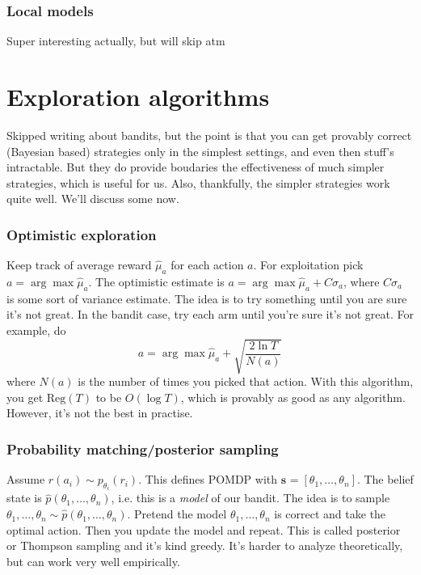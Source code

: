\documentclass{report}
\newcommand{\argmax}{\arg\!\max}
\begin{document}
\subsection{Local models}
Super interesting actually, but will skip atm

\chapter{Exploration algorithms}
Skipped writing about bandits, but the point is that you can get provably correct (Bayesian based) strategies only in the simplest settings,
and even then stuff's intractable. But they do provide boudaries the effectiveness of much simpler strategies, which is useful for us.
Also, thankfully, the simpler strategies work quite well. We'll discuss some now.

\subsection{Optimistic exploration}
Keep track of average reward $\hat{\mu}_a$ for each action $a$.
For exploitation pick $a = \argmax \hat{\mu}_a$.
The optimistic estimate is $a = \argmax \hat{\mu}_a + C \sigma_a$,
where $C \sigma_a$ is some sort of variance estimate.
The idea is to try something until you are sure it's not great.
In the bandit case, try each arm until you're sure it's not great.
For example, do 
\begin{equation}
		a = \argmax \hat{\mu}_a + \sqrt{ \frac{2 \ln T}{N(a)} }
\end{equation}
where $N(a)$ is the number of times you picked that action.
With this algorithm, you get $\text{Reg}(T)$ to be $O(\log T)$, which is provably as good as any algorithm.
However, it's not the best in practise.

\subsection{Probability matching/posterior sampling}
Assume $ r(a_i) \sim p_{\theta_i} (r_i)  $. This defines POMDP with $ \bm{s}_{} = \left[ \theta_1, \dots, \theta_n \right]   $.
The belief state is $\hat{p}(\theta_1, \dots, \theta_n)$, i.e. this is a \textit{model} of our bandit.
The idea is to sample $ \theta_1, \dots, \theta_n  \sim \hat{p}(\theta_1, \dots, \theta_n)$. Pretend
the model $   \theta_1, \dots, \theta_n$ is correct and take the optimal action.
Then you update the model and repeat.
This is called posterior or Thompson sampling and it's kind greedy.
It's harder to analyze theoretically, but can work very well empirically.
\end{document}
